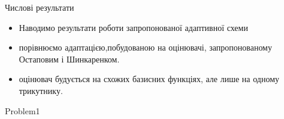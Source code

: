 
\begin{frame}{Числові результати}
	\begin{itemize}
		\item Наводимо результати роботи запропонованої адаптивної схеми
		\item порівнюємо адаптацією,побудованою на оцінювачі, запропонованому Остаповим і Шинкаренком.
		\item оцінювач будується на схожих базисних функціях, але лише на одному трикутнику.
	\end{itemize}
\end{frame}


{Problem1}
